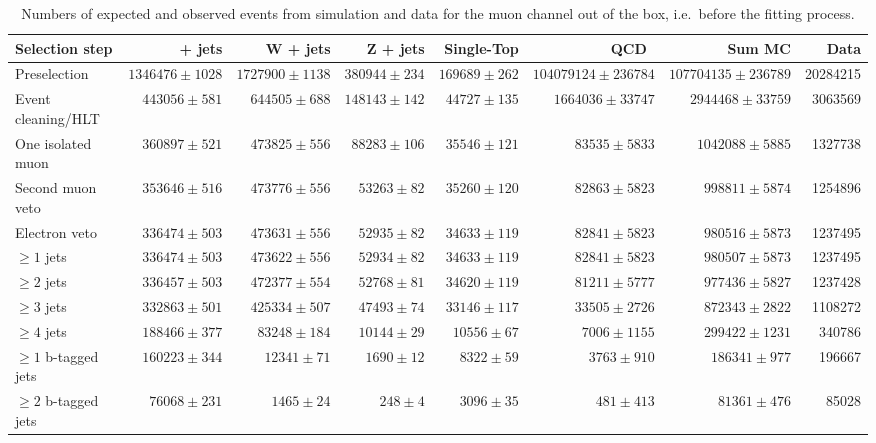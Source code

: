 \begin{table}
  \centering
   \caption{Numbers of expected and observed events from simulation and data
   for the muon channel out of the box, i.e.\ before the fitting process.}
    \label{tab:event_yields_mujets}
    \resizebox{\columnwidth}{!} {
    \begin{tabular}{lrrrrrrr}
    \toprule
	Selection step & \ttbar + jets & W + jets & Z + jets & Single-Top & QCD~  & Sum MC & Data \\
	\midrule
	Preselection  &  $1346476 \pm 1028$ &  $1727900 \pm 1138$ &  $380944 \pm 234$ &  $169689 \pm 262$ &  $104079124 \pm 236784$ &  $107704135 \pm 236789$ &  20284215 \\ 
	Event cleaning/HLT  &  $443056 \pm 581$ &  $644505 \pm 688$ &  $148143 \pm 142$ &  $44727 \pm 135$ &  $1664036 \pm 33747$ &  $2944468 \pm 33759$ &  3063569 \\ 
	One isolated muon  &  $360897 \pm 521$ &  $473825 \pm 556$ &  $88283 \pm 106$ &  $35546 \pm 121$ &  $83535 \pm 5833$ &  $1042088 \pm 5885$ &  1327738 \\ 
	Second muon veto  &  $353646 \pm 516$ &  $473776 \pm 556$ &  $53263 \pm 82$ &  $35260 \pm 120$ &  $82863 \pm 5823$ &  $998811 \pm 5874$ &  1254896 \\ 
	Electron veto  &  $336474 \pm 503$ &  $473631 \pm 556$ &  $52935 \pm 82$ &  $34633 \pm 119$ &  $82841 \pm 5823$ &  $980516 \pm 5873$ &  1237495 \\ 
	$\geq 1$ jets  &  $336474 \pm 503$ &  $473622 \pm 556$ &  $52934 \pm 82$ &  $34633 \pm 119$ &  $82841 \pm 5823$ &  $980507 \pm 5873$ &  1237495 \\ 
	$\geq 2$ jets  &  $336457 \pm 503$ &  $472377 \pm 554$ &  $52768 \pm 81$ &  $34620 \pm 119$ &  $81211 \pm 5777$ &  $977436 \pm 5827$ &  1237428 \\ 
	$\geq 3$ jets  &  $332863 \pm 501$ &  $425334 \pm 507$ &  $47493 \pm 74$ &  $33146 \pm 117$ &  $33505 \pm 2726$ &  $872343 \pm 2822$ &  1108272 \\ 
	$\geq 4$ jets  &  $188466 \pm 377$ &  $83248 \pm 184$ &  $10144 \pm 29$ &  $10556 \pm 67$ &  $7006 \pm 1155$ &  $299422 \pm 1231$ &  340786 \\ 
	$\geq 1$ b-tagged jets  &  $160223 \pm 344$ &  $12341 \pm 71$ &  $1690 \pm 12$ &  $8322 \pm 59$ &  $3763 \pm 910$ &  $186341 \pm 977$ &  196667 \\ 
	$\geq 2$ b-tagged jets  &  $76068 \pm 231$ &  $1465 \pm 24$ &  $248 \pm 4$ &  $3096 \pm 35$ &  $481 \pm 413$ &  $81361 \pm 476$ &  85028 \\ 
	\bottomrule
	\end{tabular}
	}
\end{table}

